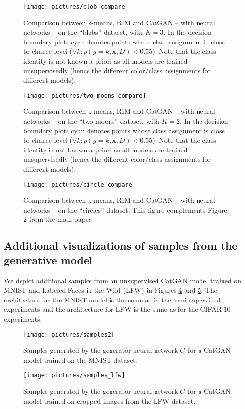 \documentclass{article} \usepackage{iclr2016_conference,times}
\newcommand{\bx}{\mathbf{x}}
\begin{document}
\begin{appendix}
\begin{figure}[h]
  \texttt{[image: pictures/blob\_compare]}
  \caption{Comparison between k-means, RIM and CatGAN -- with neural
    networks -- on the ``blobs'' dataset, with $K=3$. In the decision boundary
    plots cyan denotes points whose class assignment is close to
    chance level ($\forall k : p(y = k, \bx, D) < 0.55$). Note that the
    class identity is not known a priori as all models are trained
    unsupervisedly (hence the different color/class assignments for
    different models).}
  \label{fig:blobs_compare}
\end{figure}

\begin{figure}[h]
  \texttt{[image: pictures/two\_moons\_compare]}
  \caption{Comparison between k-means, RIM and CatGAN -- with neural
    networks -- on the ``two moons'' dataset, with $K=2$. In the decision boundary
    plots cyan denotes points whose class assignment is close to
    chance level ($\forall k : p(y = k, \bx, D) < 0.55$). Note that the
    class identity is not known a priori as all models are trained
    unsupervisedly (hence the different color/class assignments for
    different models).}
  \label{fig:moons_compare}
\end{figure}



\begin{figure}[h]
  \texttt{[image: pictures/circle\_compare]}
  \caption{Comparison between k-means, RIM and CatGAN -- with neural
    networks -- on the ``circles'' dataset. This figure complements
    Figure 2 from the main paper.}
  \label{fig:circles_compare}
\end{figure}

\subsection{Additional visualizations of samples from the generative model}
We depict additional samples from an unsupervised CatGAN model trained
on MNIST and Labeled Faces in the Wild (LFW)\citep{LFWTech} in Figures
\ref{fig:mnist_samples_big} and \ref{fig:lfw_samples_big}. The
architecture for the MNIST model is the same as in the semi-supervised
experiments and the architecture for LFW is the same as for the
CIFAR-10 experiments.

\begin{figure}[h]
  \centering
  \texttt{[image: pictures/samples2]}
  \caption{Samples generated by the generator neural network $G$ for a
    CatGAN model trained on the MNIST dataset.}
  \label{fig:mnist_samples_big}
\end{figure}


\begin{figure}[h]
  \texttt{[image: pictures/samples\_lfw]}
  \caption{Samples generated by the generator neural network $G$ for a
    CatGAN model trained on cropped images from the LFW dataset.}
  \label{fig:lfw_samples_big}
\end{figure}

\end{appendix}
\end{document}
